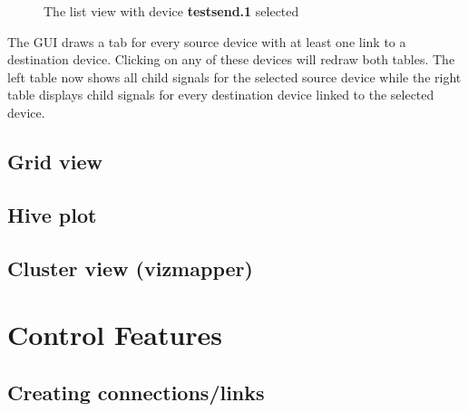\begin{figure}[ht]
\centering
\caption{The list view with device \textbf{testsend.1} selected}
\label{fig:list_view_single_link}
\end{figure}

The GUI draws a tab for every source device with at least one link to a destination device. Clicking on any of these devices will redraw both tables. The left table now shows all child signals for the selected source device while the right table displays child signals for every destination device linked to the selected device. 

\subsection{Grid view}
\subsection{Hive plot}
\subsection{Cluster view (vizmapper)}

\section{Control Features}
\subsection{Creating connections/links}
